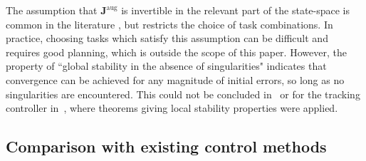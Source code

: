 \documentclass[../main.tex]{subfiles}
\begin{document}


\begin{remark}
    \label{remark-singularities}
    The assumption that $\bm{J}^{\textrm{aug}}$ is invertible in the relevant part of the state-space is common in the literature \cite{antonelli2009,Dietrich2020,Wu2022}, but restricts the choice of task combinations. In practice, choosing tasks which satisfy this assumption can be difficult and requires good planning, which is outside the scope of this paper.
    However, the property of ``global stability in the absence of singularities" indicates that convergence can be achieved for any magnitude of initial errors, so long as no singularities are encountered. This could not be concluded in~\cite{Saeboe2022} or for the tracking controller in~\cite{Dietrich2020}, where theorems giving local stability properties were applied.
\end{remark}

\subsection{Comparison with existing control methods}
\end{document}
